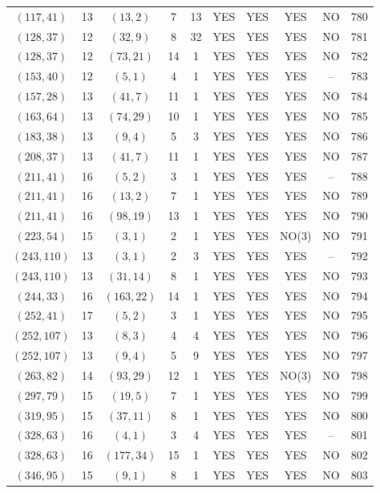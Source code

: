 \begin{longtable}{|c|c|c|c|c|c|c|c|c|c|}
$(117, 41)$ & 13 & $(13, 2)$ & 7 & 13 & YES & YES & YES & NO & 780\\
$(128, 37)$ & 12 & $(32, 9)$ & 8 & 32 & YES & YES & YES & NO & 781\\
$(128, 37)$ & 12 & $(73, 21)$ & 14 & 1 & YES & YES & YES & NO & 782\\
$(153, 40)$ & 12 & $(5, 1)$ & 4 & 1 & YES & YES & YES & -- & 783\\
$(157, 28)$ & 13 & $(41, 7)$ & 11 & 1 & YES & YES & YES & NO & 784\\
$(163, 64)$ & 13 & $(74, 29)$ & 10 & 1 & YES & YES & YES & NO & 785\\
$(183, 38)$ & 13 & $(9, 4)$ & 5 & 3 & YES & YES & YES & NO & 786\\
$(208, 37)$ & 13 & $(41, 7)$ & 11 & 1 & YES & YES & YES & NO & 787\\
$(211, 41)$ & 16 & $(5, 2)$ & 3 & 1 & YES & YES & YES & -- & 788\\
$(211, 41)$ & 16 & $(13, 2)$ & 7 & 1 & YES & YES & YES & NO & 789\\
$(211, 41)$ & 16 & $(98, 19)$ & 13 & 1 & YES & YES & YES & NO & 790\\
$(223, 54)$ & 15 & $(3, 1)$ & 2 & 1 & YES & YES & NO(3) & NO & 791\\
$(243, 110)$ & 13 & $(3, 1)$ & 2 & 3 & YES & YES & YES & -- & 792\\
$(243, 110)$ & 13 & $(31, 14)$ & 8 & 1 & YES & YES & YES & NO & 793\\
$(244, 33)$ & 16 & $(163, 22)$ & 14 & 1 & YES & YES & YES & NO & 794\\
$(252, 41)$ & 17 & $(5, 2)$ & 3 & 1 & YES & YES & YES & NO & 795\\
$(252, 107)$ & 13 & $(8, 3)$ & 4 & 4 & YES & YES & YES & NO & 796\\
$(252, 107)$ & 13 & $(9, 4)$ & 5 & 9 & YES & YES & YES & NO & 797\\
$(263, 82)$ & 14 & $(93, 29)$ & 12 & 1 & YES & YES & NO(3) & NO & 798\\
$(297, 79)$ & 15 & $(19, 5)$ & 7 & 1 & YES & YES & YES & NO & 799\\
$(319, 95)$ & 15 & $(37, 11)$ & 8 & 1 & YES & YES & YES & NO & 800\\
$(328, 63)$ & 16 & $(4, 1)$ & 3 & 4 & YES & YES & YES & -- & 801\\
$(328, 63)$ & 16 & $(177, 34)$ & 15 & 1 & YES & YES & YES & NO & 802\\
$(346, 95)$ & 15 & $(9, 1)$ & 8 & 1 & YES & YES & YES & NO & 803\\

\end{longtable}
